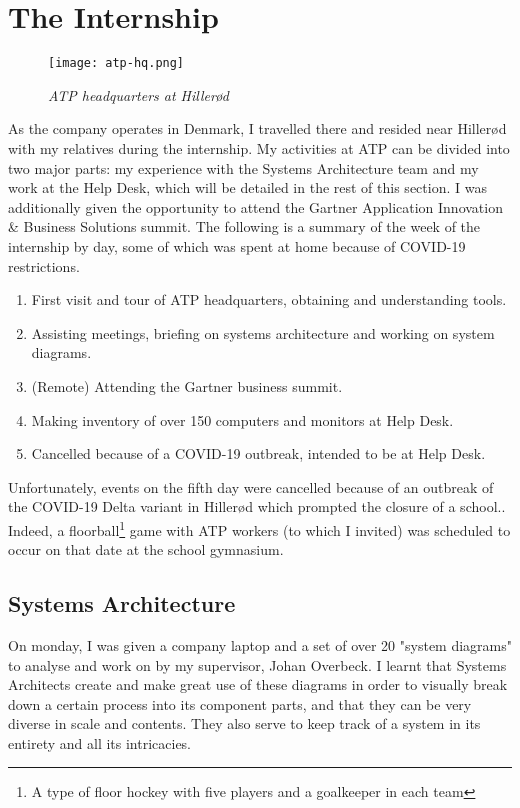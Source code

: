 \section{The Internship}

\begin{figure}[H]
    \centering
        \texttt{[image: atp-hq.png]}
        \caption*{\textit{ATP headquarters at Hillerød\cite{about_atp}}}
\end{figure}

As the company operates in Denmark, I travelled there and resided near Hillerød
with my relatives during the internship. My activities at ATP can be divided
into two major parts: my experience with the Systems Architecture team and my
work at the Help Desk, which will be detailed in the rest of this section. I was
additionally given the opportunity to attend the Gartner Application Innovation
\& Business Solutions summit. The following is a summary of the week of the
internship by day, some of which was spent at home because of COVID-19
restrictions.

\begin{enumerate}
    \item First visit and tour of ATP headquarters, obtaining and understanding
          tools.
    \item Assisting meetings, briefing on systems architecture and working on
          system diagrams.
    \item (Remote) Attending the Gartner business summit.
    \item Making inventory of over 150 computers and monitors at Help Desk.
    \item Cancelled because of a COVID-19 outbreak, intended to be at Help Desk.
\end{enumerate}

Unfortunately, events on the fifth day were cancelled because of an outbreak of
the COVID-19 Delta variant in Hillerød which prompted the closure of a
school.\cite{covid_rip}. Indeed, a floorball\footnote[0]{A type of floor hockey
with five players and a goalkeeper in each team} game with ATP workers (to which
I invited) was scheduled to occur on that date at the school gymnasium.

\subsection{Systems Architecture}

On monday, I was given a company laptop and a set of over 20 "system diagrams"
to analyse and work on by my supervisor, Johan Overbeck. I learnt that Systems
Architects create and make great use of these diagrams in order to visually
break down a certain process into its component parts, and that they can be very
diverse in scale and contents. They also serve to keep track of a system in its
entirety and all its intricacies.



